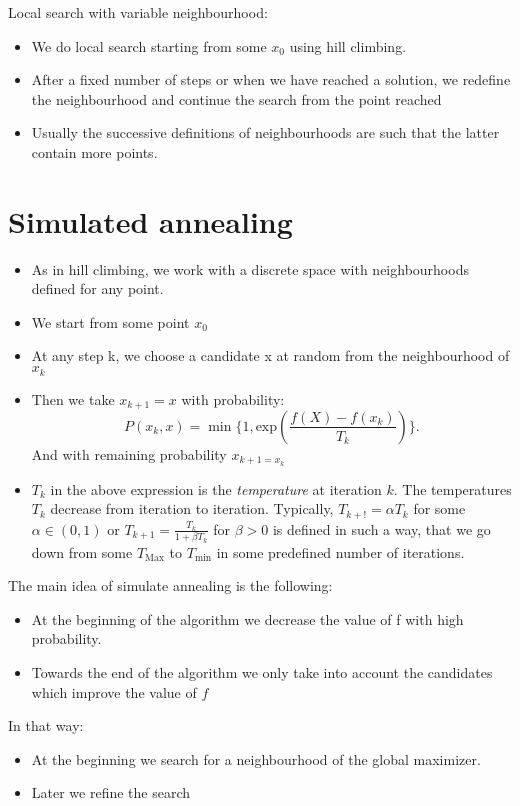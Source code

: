 Local search with variable neighbourhood:
\begin{itemize}
        \item We do local search starting from some $x_0$ using hill climbing.
        \item After a fixed number of steps or when we have reached a solution, we redefine the neighbourhood and continue the search from the point reached
        \item Usually the successive definitions of neighbourhoods are such that the latter contain more points.
        
\end{itemize}

\section{Simulated annealing}
\begin{itemize}
        \item As in hill climbing, we work with a discrete space with neighbourhoods defined for any point.
        \item We start from some point $x_0$ 
        \item At any step k, we choose a candidate x at random from the neighbourhood of $x_k$ 
        \item Then we take $x_{k+1} = x$ with probability:
             \[
                 P(x_k,x) = \min{ \{1,\text{exp}(\frac{f(X)-f(x_k)}{T_k})\}}
                 
            .\] 
            And with remaining probability $x_{k+1 = x_k}$
        \item $T_k$ in the above expression is the \textit{temperature} at iteration $k$. The temperatures $T_k$ decrease from iteration to iteration. Typically, $T_{k+!} = \alpha T_k$ for some  $\alpha \in (0,1)$ or  $T_{k+1} = \frac{T_k}{1+\beta T_k}$ for $\beta > 0$ is defined in such a way, that we go down from some  $T_{\text{Max}}$ to  $T_{\text{min}}$ in some predefined number of iterations.
\end{itemize}

The main idea of simulate annealing is the following:
\begin{itemize}
        \item  At the beginning of the algorithm we decrease the value of f with high probability.
        \item Towards the end of the algorithm we only take into account the candidates which improve the value of $f$

        
\end{itemize}
In that way:
\begin{itemize}
        \item At the beginning we search for a neighbourhood of the global maximizer.
        \item Later we refine the search
        
\end{itemize}


